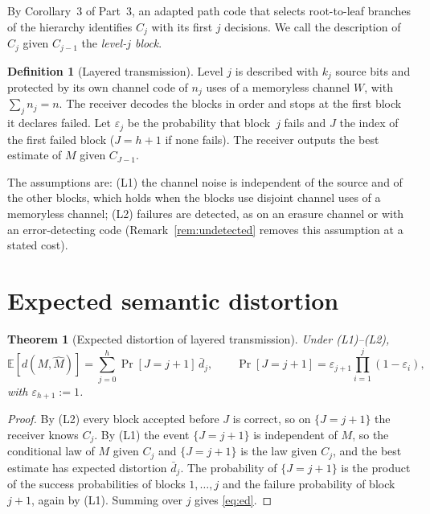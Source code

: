 \documentclass[11pt]{article}
\newtheorem{theorem}{Theorem}
\theoremstyle{definition}
\newtheorem{definition}{Definition}
\theoremstyle{remark}
\newcommand{\E}{\mathbb{E}}
\begin{document}
By Corollary~3 of Part~3, an adapted path code that selects root-to-leaf branches of the hierarchy identifies $C_j$ with its first $j$ decisions. We call the description of $C_j$ given $C_{j-1}$ the \emph{level-$j$ block}.

\begin{definition}[Layered transmission]\label{def:layered}
Level $j$ is described with $k_j$ source bits and protected by its own channel code of $n_j$ uses of a memoryless channel $W$, with $\sum_jn_j=n$. The receiver decodes the blocks in order and stops at the first block it declares failed. Let $\varepsilon_j$ be the probability that block~$j$ fails and $J$ the index of the first failed block ($J=h+1$ if none fails). The receiver outputs the best estimate of $M$ given $C_{J-1}$.
\end{definition}

The assumptions are: (L1) the channel noise is independent of the source and of the other blocks, which holds when the blocks use disjoint channel uses of a memoryless channel; (L2) failures are detected, as on an erasure channel or with an error-detecting code (Remark~\ref{rem:undetected} removes this assumption at a stated cost).

\section{Expected semantic distortion}

\begin{theorem}[Expected distortion of layered transmission]\label{thm:ed}
Under (L1)--(L2),
\begin{equation}\label{eq:ed}
\E[d(M,\hat M)]=\sum_{j=0}^{h}\Pr[J=j+1]\,\bar d_j,\qquad \Pr[J=j+1]=\varepsilon_{j+1}\prod_{i=1}^{j}(1-\varepsilon_i),
\end{equation}
with $\varepsilon_{h+1}:=1$.
\end{theorem}

\begin{proof}
By (L2) every block accepted before $J$ is correct, so on $\{J=j+1\}$ the receiver knows $C_j$. By (L1) the event $\{J=j+1\}$ is independent of $M$, so the conditional law of $M$ given $C_j$ and $\{J=j+1\}$ is the law given $C_j$, and the best estimate has expected distortion $\bar d_j$. The probability of $\{J=j+1\}$ is the product of the success probabilities of blocks $1,\dots,j$ and the failure probability of block $j+1$, again by (L1). Summing over $j$ gives \eqref{eq:ed}.
\end{proof}
\end{document}
